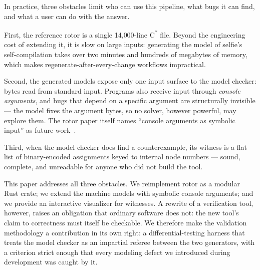\documentclass[sigplan,screen,nonacm]{acmart}
\begin{document}
In practice, three obstacles limit who can use this pipeline, what bugs
it can find, and what a user can do with the answer.

First, the reference rotor is a single 14{,}000-line
C\textsuperscript{*} file. Beyond the engineering cost of extending it,
it is slow on large inputs: generating the model of selfie's
self-compilation takes over two minutes and hundreds of megabytes of
memory, which makes regenerate-after-every-change workflows impractical.

Second, the generated models expose only one input surface to the model
checker: bytes read from standard input. Programs also receive input
through \emph{console arguments}, and bugs that depend on a specific
argument are structurally invisible --- the model fixes the argument
bytes, so no solver, however powerful, may explore them. The rotor paper
itself names ``console arguments as symbolic input'' as future
work~\cite{rotorpaper}.

Third, when the model checker does find a counterexample, its witness is
a flat list of binary-encoded assignments keyed to internal node numbers
--- sound, complete, and unreadable for anyone who did not build the
tool.

This paper addresses all three obstacles. We reimplement rotor as a
modular Rust crate; we extend the machine models with symbolic console
arguments; and we provide an interactive visualizer for witnesses. A
rewrite of a verification tool, however, raises an obligation that
ordinary software does not: the new tool's claim to correctness must
itself be checkable. We therefore make the validation methodology a
contribution in its own right: a differential-testing harness that
treats the model checker as an impartial referee between the two
generators, with a criterion strict enough that every modeling defect we
introduced during development was caught by it.
\end{document}
